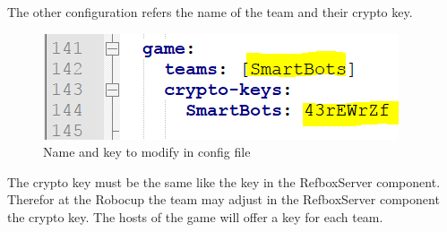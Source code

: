 The other configuration refers the name of the team and their crypto key. 

\begin{figure}[!h]
\centering
\includegraphics[]{pic/config_file_2.png}
\caption{Name and key to modify in config file}
\label{fig:configFile2}
\end{figure}

The crypto key must be the same like the key in the RefboxServer component. Therefor at the Robocup the team may adjust in the RefboxServer component the crypto key. The hosts of the game will offer a key for each team.

